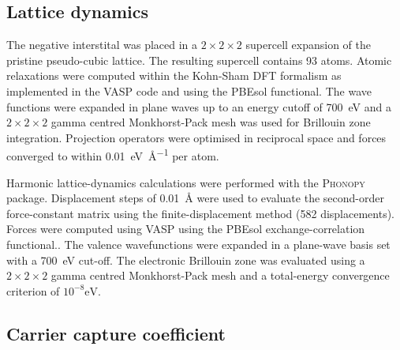 
\subsection{Lattice dynamics}

The negative interstital was placed in a $2\!\times\!2\!\times\!2$ supercell expansion of the pristine pseudo-cubic lattice. The resulting supercell contains 93 atoms. Atomic relaxations were computed within the Kohn-Sham DFT formalism as implemented in the \textsc{VASP} code\autocite{Kresse1996a} and using the PBEsol functional. The wave functions were expanded in plane waves up to an energy cutoff of \SI{700}{\electronvolt} and a $2\! \times\! 2\! \times\! 2$ gamma centred Monkhorst-Pack mesh was used for Brillouin zone integration.  Projection operators were optimised in reciprocal space and forces converged to within \SI{0.01}{\electronvolt\per\angstrom} per atom.

Harmonic lattice-dynamics calculations were performed with the \textsc{Phonopy} package.\autocite{Togo2015} Displacement steps of \SI{0.01}{\angstrom} were used to evaluate the second-order force-constant matrix using the finite-displacement method (582 displacements).
Forces were computed using \textsc{VASP} using the PBEsol exchange-correlation functional.\autocite{Perdew2008a}.
The valence wavefunctions were expanded in a plane-wave basis set with a \SI{700}{\electronvolt} cut-off. The electronic Brillouin zone was evaluated using a $2\!\times\!2\!\times\!2$ gamma centred Monkhorst-Pack mesh and a total-energy convergence criterion of $10^{-8}\textrm{eV}$.

\subsection{Carrier capture coefficient}

